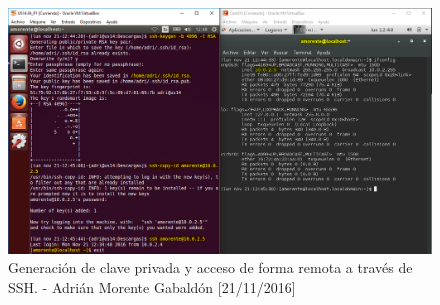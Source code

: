 \begin{figure}[H]
	\centering
	\includegraphics[scale=0.4]{ssh-keygen}
	\caption{Generación de clave privada y acceso de forma remota a través de SSH. - Adrián Morente Gabaldón [21/11/2016]}
	\label{fig:figura7}
\end{figure}


